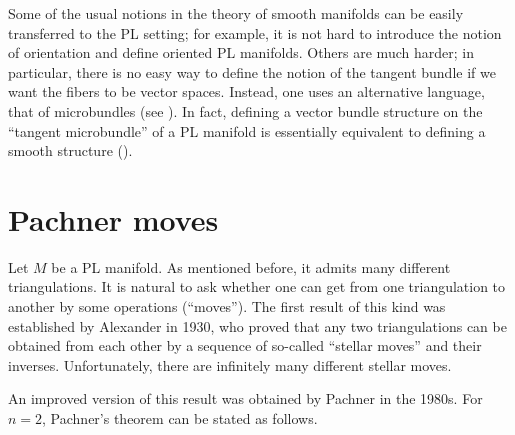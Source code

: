 Some of the usual notions in the theory of smooth manifolds can be easily
transferred to the PL setting; for example, it is not hard to introduce the
notion of orientation and define oriented PL manifolds. Others are much harder;
in particular, there is no easy way to define the notion of the tangent bundle
if we want the fibers to be vector spaces. Instead, one uses an alternative
language, that of microbundles (see \cite[Lecture 10]{lurie-PL}). In fact,
defining a vector bundle structure on the ``tangent microbundle'' of a PL
manifold is essentially equivalent to defining a smooth structure
(\cite{hirsch-mazur}).

\section{Pachner moves}\label{s:pachner}
Let $M$ be a PL manifold. As mentioned before, it admits many different
triangulations. It is natural to ask whether one can get from one triangulation
to another by some operations (``moves''). The first result of this kind was
established by Alexander in 1930, who proved that any two triangulations can be
obtained from each other by a sequence of so-called ``stellar moves'' and their
inverses. Unfortunately, there are infinitely many different stellar moves.

An improved version of this result was obtained by Pachner in the 1980s. For
$n=2$, Pachner's theorem can be stated as follows.

